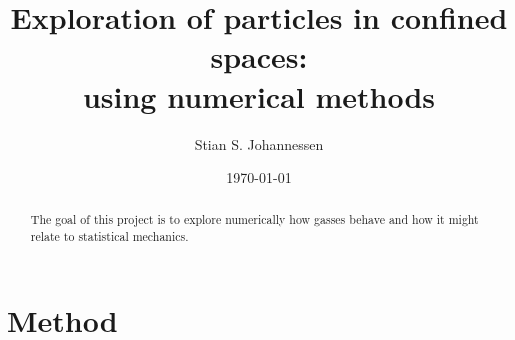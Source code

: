\documentclass[10pt,a4paper,aps,twocolumn,secnumarabic,numerical,balancelastpage,nofootinbib,superscriptaddress]{revtex4-2}
\begin{document}

\title{Exploration of particles in confined spaces:\\using numerical methods}%

\author{Stian S. Johannessen}
\date{\today}

\begin{abstract}
	The goal of this project is to explore numerically how gasses behave and how it might relate to statistical mechanics.
\end{abstract}

\maketitle

	\section{Method}
	
\end{document}
